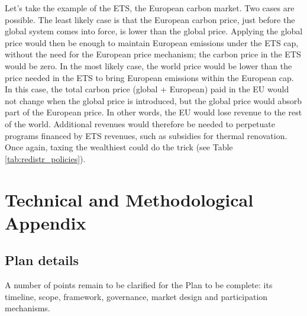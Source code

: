 \documentclass[a5paper,english,openany]{memoir}
\begin{document}
Let's take the example of the ETS, the European carbon market. Two cases are possible. The least likely case is that the European carbon price, just before the global system comes into force, %
is lower than the global price. Applying the global price would then be enough to maintain European emissions under the ETS cap, without the need for the European price mechanism; %
the carbon price in the ETS would be zero. In the most likely case, the world price would be lower than the price needed in the ETS to bring European emissions within the European cap. In this case, the total carbon price (global + European) paid in the EU would not change when the global price is introduced, but the global price would absorb part of the European price. In other words, the EU would lose revenue to the rest of the world. Additional revenues would therefore be needed to perpetuate programs financed by ETS revenues, such as subsidies for thermal renovation. Once again, taxing the wealthiest could do the trick (see Table \ref{tab:redistr_policies}).


\appendix

\part*{Technical and Methodological Appendix}\label{annex}

\chapter{Plan details\label{ch:details}} 

A number of points remain to be clarified for the Plan to be complete: its timeline, %
scope, framework, governance, market design and participation mechanisms. 
\end{document}
